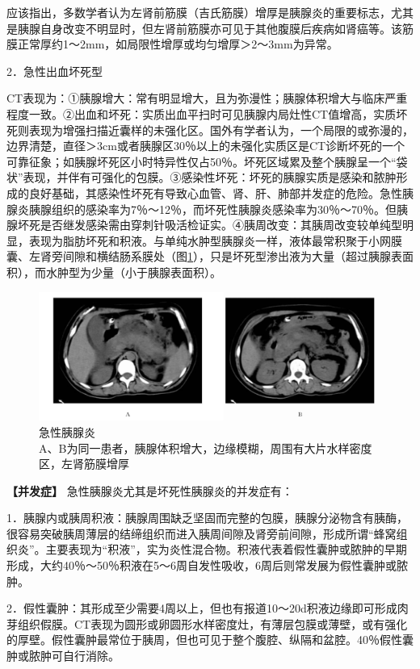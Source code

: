 应该指出，多数学者认为左肾前筋膜（吉氏筋膜）增厚是胰腺炎的重要标志，尤其是胰腺自身改变不明显时，但左肾前筋膜亦可见于其他腹膜后疾病如肾癌等。该筋膜正常厚约1～2mm，如局限性增厚或均匀增厚＞2～3mm为异常。

2．急性出血坏死型

CT表现为：①胰腺增大：常有明显增大，且为弥漫性；胰腺体积增大与临床严重程度一致。②出血和坏死：实质出血平扫时可见胰腺内局灶性CT值增高，实质坏死则表现为增强扫描近囊样的未强化区。国外有学者认为，一个局限的或弥漫的，边界清楚，直径＞3cm或者胰腺区30％以上的未强化实质区是CT诊断坏死的一个可靠征象；如胰腺坏死区小时特异性仅占50％。坏死区域累及整个胰腺呈一个“袋状”表现，并伴有可强化的包膜。③感染性坏死：坏死的胰腺实质是感染和脓肿形成的良好基础，其感染性坏死有导致心血管、肾、肝、肺部并发症的危险。急性胰腺炎胰腺组织的感染率为7％～12％，而坏死性胰腺炎感染率为30％～70％。但胰腺坏死是否继发感染需由穿刺针吸活检证实。④胰周改变：其胰周改变较单纯型明显，表现为脂肪坏死和积液。与单纯水肿型胰腺炎一样，液体最常积聚于小网膜囊、左肾旁间隙和横结肠系膜处（图\ref{fig13-1}），只是坏死型渗出液为大量（超过胰腺表面积），而水肿型为少量（小于胰腺表面积）。

\begin{figure}[!htbp]
 \centering
 \includegraphics[width=.7\textwidth,height=\textheight,keepaspectratio]{./images/Image00300.jpg}
 \captionsetup{justification=centering}
 \caption{急性胰腺炎\\{\small A、B为同一患者，胰腺体积增大，边缘模糊，周围有大片水样密度区，左肾筋膜增厚}}
 \label{fig13-1}
  \end{figure} 

\textbf{【并发症】} 急性胰腺炎尤其是坏死性胰腺炎的并发症有：

1．胰腺内或胰周积液：胰腺周围缺乏坚固而完整的包膜，胰腺分泌物含有胰酶，很容易突破胰周薄层的结缔组织而进入胰周间隙及肾旁前间隙，形成所谓“蜂窝组织炎”。主要表现为“积液”，实为炎性混合物。积液代表着假性囊肿或脓肿的早期形成，大约40％～50％积液在5～6周自发性吸收，6周后则常发展为假性囊肿或脓肿。

2．假性囊肿：其形成至少需要4周以上，但也有报道10～20d积液边缘即可形成肉芽组织假膜。CT表现为圆形或卵圆形水样密度灶，有薄层包膜或薄壁，或有强化的厚壁。假性囊肿最常位于胰周，但也可见于整个腹腔、纵隔和盆腔。40％假性囊肿或脓肿可自行消除。

